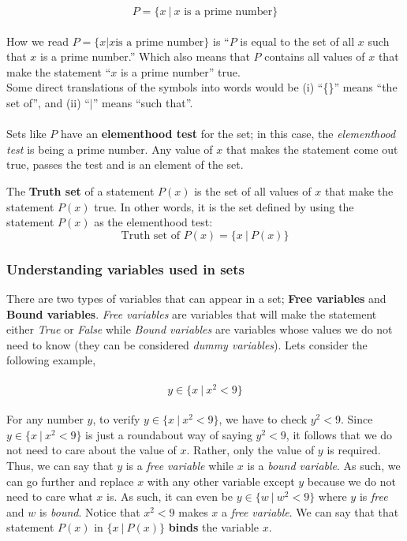 \documentclass[../setup.tex]{subfiles}
\begin{document}
\[ P = \{x \ |\  x \text{ is a prime number}\} \]
\\
How we read $P = \{x | x \text{is a prime number}\}$ is ``$P$ is equal to the set of all $x$ such that $x$ is a prime number.'' Which also means that $P$ contains all values of $x$ that make the statement ``$x$ is a prime number'' true. \\
Some direct translations of the symbols into words would be (i) ``\{\}'' means ``the set of'', and (ii) ``$|$'' means ``such that''. \\
\\
Sets like $P$ have an \textbf{elementhood test} for the set; in this case, the \textit{elementhood test} is being a prime number. Any value of $x$ that makes the statement come out true, passes the test and is an element of the set. \\
\begin{theorem}
The \textbf{Truth set} of a statement $P(x)$ is the set of all values of $x$ that make the statement $P(x)$ true. In other words, it is the set defined by using the statement $P(x)$ as the elementhood test: \\
\[ \text{Truth set of } P(x) = \{x \ | \ P(x)\} \]
\end{theorem}

\subsubsection{Understanding variables used in sets}
There are two types of variables that can appear in a set; \textbf{Free variables} and \textbf{Bound variables}. \textit{Free variables} are variables that will make the statement either \textit{True} or \textit{False} while \textit{Bound variables} are variables whose values we do not need to know (they can be considered \textit{dummy variables}). Lets consider the following example, \\
\\
 \[ y \in \{x \ | \ x^2 < 9\} \] 
\\
For any number $y$, to verify $y \in \{x \ | \ x^2 < 9\}$, we have to check $y^2 < 9$. Since $y \in \{x \ | \ x^2 < 9\}$ is just a roundabout way of saying $y^2 < 9$, it follows that we do not need to care about the value of $x$. Rather, only the value of $y$ is required. Thus, we can say that $y$ is a \textit{free variable} while $x$ is a \textit{bound variable}. As such, we can go further and replace $x$ with any other variable except $y$ because we do not need to care what $x$ is. As such, it can even be $y \in \{w\ | \ w^2 < 9\}$ where $y$ is \textit{free} and $w$ is \textit{bound}. Notice that $x^2 < 9$ makes $x$ a \textit{free variable}. We can say that that statement $P(x)$ in $\{x \ | \ P(x)\}$ \textbf{binds} the variable $x$. 
\end{document}

